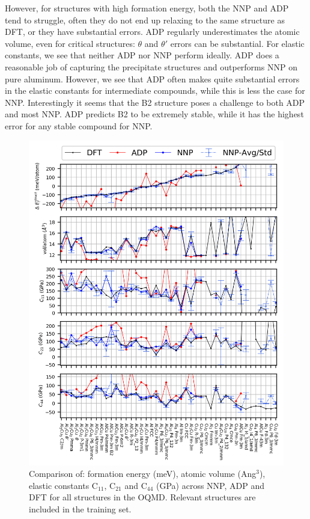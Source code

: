 \documentclass{article}
\begin{document}
However, for structures with high formation energy, both the NNP and ADP tend to struggle, often they do not end up relaxing to the same structure as DFT, or they have substantial errors.
ADP regularly underestimates the atomic volume, even for critical structures: $\theta$ and $\theta'$ errors can be substantial.
For elastic constants, we see that neither ADP nor NNP perform ideally.
ADP does a reasonable job of capturing the precipitate structures and outperforms NNP on pure aluminum.
However, we see that ADP often makes quite substantial errors in the elastic constants for intermediate compounds, while this is less the case for NNP. Interestingly it seems that the B2 structure poses a challenge to both ADP and most NNP.
ADP predicts B2 to be extremely stable, while it has the highest error for any stable compound for NNP. 


\begin{figure}[H]%
\centering%
\includegraphics[width=1\textwidth,center]{figures/matparam_stats1.png}%
\caption{Comparison of: formation energy (meV), atomic volume (Ang$^3$), elastic constants C$_{11}$, C$_{21}$ and C$_{44}$ (GPa) across NNP, ADP and DFT for all structures in the OQMD. 
Relevant structures are included in the training set. }
\label{fig:matparam_stats1}
\end{figure}
\end{document}
